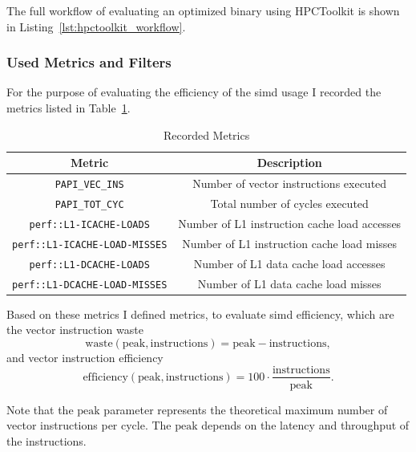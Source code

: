 \documentclass[a4paper, 11pt]{memoir}
\begin{document}
    The full workflow of evaluating an optimized binary using HPCToolkit is shown in Listing~\ref{lst:hpctoolkit_workflow}.

    \subsubsection{Used Metrics and Filters}
    For the purpose of evaluating the efficiency of the \gls{simd} usage I recorded the metrics listed in Table~\ref{tab:metrics}.
    \begin{table}[b]
        \centering
        \begin{tabular}{|c|c|}
            \hline
            Metric & Description \\\hline
            \texttt{PAPI_VEC_INS} & Number of vector instructions executed\\
            \texttt{PAPI_TOT_CYC} & Total number of cycles executed\\
            \texttt{perf::L1-ICACHE-LOADS} & Number of L1 instruction cache load accesses\\
            \texttt{perf::L1-ICACHE-LOAD-MISSES} & Number of L1 instruction cache load misses\\
            \texttt{perf::L1-DCACHE-LOADS} & Number of L1 data cache load accesses\\
            \texttt{perf::L1-DCACHE-LOAD-MISSES} & Number of L1 data cache load misses\\
            \hline
        \end{tabular}
        \caption{Recorded Metrics}
        \label{tab:metrics}
    \end{table}

    Based on these metrics I defined metrics, to evaluate \gls{simd} efficiency, which are the vector instruction waste
    \begin{equation}
        \text{waste}(\text{peak}, \text{instructions}) = \text{peak} - \text{instructions},
        \label{eq:vec_waste}
    \end{equation}
    and vector instruction efficiency
    \begin{equation}
        \text{efficiency}(\text{peak}, \text{instructions}) = 100 \cdot \frac{\text{instructions}}{\text{peak}}.
        \label{eq:vec_efficiency}
    \end{equation}

    Note that the $\text{peak}$ parameter represents the theoretical maximum number of vector instructions per cycle. The
    $\text{peak}$ depends on the \gls{latency} and \gls{throughput} of the instructions.
\end{document}

